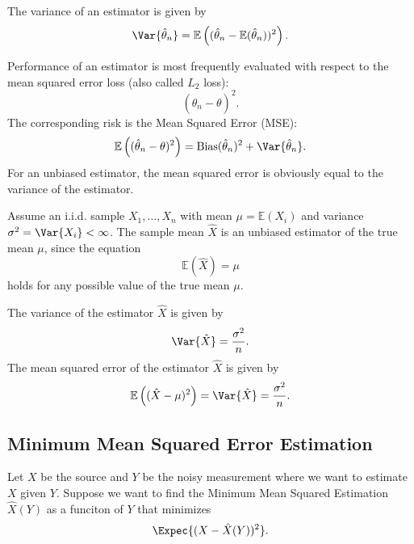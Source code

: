 \documentclass{article}
\begin{document}
The variance of an estimator is given by
\[
\Var{\hat{\theta}_n} = \mathbb{E}\left( (\hat{\theta}_n - \mathbb{E}(\hat{\theta}_n))^2 \right).
\]

Performance of an estimator is most frequently evaluated with respect to the mean squared error loss (also called \( L_2 \) loss):
\[
(\hat{\theta}_n - \theta)^2.
\]
The corresponding risk is the Mean Squared Error (MSE):
\[
\mathbb{E}\left( (\hat{\theta}_n - \theta)^2 \right) = \text{Bias}(\hat{\theta}_n)^2 + \Var{\hat{\theta}_n}.
\]
For an unbiased estimator, the mean squared error is obviously equal to the variance of the estimator.

\begin{example}
 Assume an i.i.d. sample \( X_1, \dots, X_n \) with mean \( \mu = \mathbb{E}(X_i) \) and variance \( \sigma^2 = \Var{X_i} < \infty \).
The sample mean \( \hat{X} \) is an unbiased estimator of the true mean \( \mu \), since the equation
\[
\mathbb{E}(\hat{X}) = \mu
\]
holds for any possible value of the true mean \( \mu \).

The variance of the estimator \( \hat{X} \) is given by
\[
\Var{\hat{X}} = \frac{\sigma^2}{n}.
\]
The mean squared error of the estimator \( \hat{X} \) is given by
\[
\mathbb{E}\left( (\hat{X} - \mu)^2 \right) = \Var{\hat{X}} = \frac{\sigma^2}{n}.
\]
\end{example}


\subsection{Minimum Mean Squared Error Estimation}
Let $X$ be the source and $Y$ be the noisy measurement where we want to estimate $X$ given $Y$.
Suppose we want to find the Minimum Mean Squared Estimation $\hat{X}(Y)$ as a funciton of $Y$ that minimizes
\begin{align}
    \Expec{(X-\hat{X}(Y))^2}.
\end{align}
\end{document}
